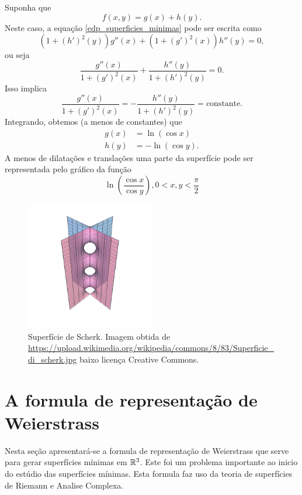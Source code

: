 \begin{exemplo}
	Suponha que
	\begin{equation*}
	f(x,y) = g(x) + h(y).
	\end{equation*}
	Neste caso, a equação \ref{edp_superficies_minimas} pode ser escrita como
	\begin{equation*}
	(1 + (h')^2(y)) g''(x) + (1 + (g')^2(x)) h''(y) = 0,
	\end{equation*}
	ou seja
	\begin{equation*}
	\frac{g''(x)}{1 + (g')^2(x)} + \frac{h''(y)}{1 + (h')^2(y)} = 0.
	\end{equation*}
	Isso implica
	\begin{equation*}
	\frac{g''(x)}{1 + (g')^2(x)} = - \frac{h''(y)}{1 + (h')^2(y)} = \text{constante}.
	\end{equation*}
	Integrando, obtemos (a menos de constantes) que
	\begin{align*}
	g(x) &= \ln (\cos x)\\
	h(y) &= -\ln (\cos y).
	\end{align*}
	A menos de dilatações e translações uma parte da superfície pode ser representada pelo gráfico da função
	\begin{equation*}
	\ln \left( \frac{\cos x}{\cos y} \right), 0 < x,y < \frac{\pi}{2}
	\end{equation*}
\end{exemplo}

\begin{figure}
	\centering
	\includegraphics[width=0.5\textwidth]{images/scherk}
	\caption{Superfície de Scherk. Imagem obtida de \url{https://upload.wikimedia.org/wikipedia/commons/8/83/Superficie_di_scherk.jpg} baixo licença Creative Commons.}
\end{figure}

\section{A formula de representação de Weierstrass}
Nesta seção apresentará-se a formula de representação de Weierstrass que serve para gerar superfícies mínimas em $\mathbb R^3$. Este foi um problema importante ao inicio do estúdio das superfícies mínimas.
Esta formula faz uso da teoria de superfícies de Riemann e Analise Complexa.


